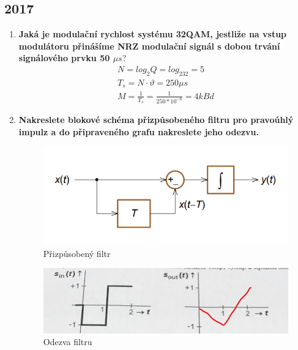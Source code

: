 \subsection{2017}
\begin{enumerate}
    \item \textbf{Jaká je modulační rychlost systému 32QAM, jestliže na vstup modulátoru přinášíme NRZ modulační signál s dobou trvání signálového prvku 50 $\mu s$}?
    \begin{gather*}
        N = log_2Q = log_232 = 5\\
        T_s = N \cdot \vartheta = 250\mu s\\
        M=\frac{1}{T_s}=\frac{1}{250*10^{-6}}=4 kBd  
    \end{gather*}

    \item \textbf{Nakreslete blokové schéma přizpůsobeného filtru pro pravoúhlý impulz a do připraveného grafu nakreslete jeho odezvu.}
    \begin{figure}[h!]
        \centering
        \includegraphics[scale=0.5]{images/prizfiltr.png}
        \caption{Přizpůsobený filtr}
        \label{fig:enter-label}
    \end{figure}
        \begin{figure}[h!]
        \centering
        \includegraphics[scale=0.5]{images/odezva.png}
        \caption{Odezva filtru}
        \label{fig:enter-label}
    \end{figure}


\end{enumerate}
